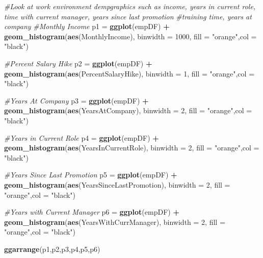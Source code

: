 \documentclass[]{article}
\newenvironment{Shaded}{\begin{snugshade}}{\end{snugshade}}
\newcommand{\KeywordTok}[1]{\textcolor[rgb]{0.13,0.29,0.53}{\textbf{#1}}}
\newcommand{\DataTypeTok}[1]{\textcolor[rgb]{0.13,0.29,0.53}{#1}}
\newcommand{\DecValTok}[1]{\textcolor[rgb]{0.00,0.00,0.81}{#1}}
\newcommand{\StringTok}[1]{\textcolor[rgb]{0.31,0.60,0.02}{#1}}
\newcommand{\CommentTok}[1]{\textcolor[rgb]{0.56,0.35,0.01}{\textit{#1}}}
\newcommand{\OperatorTok}[1]{\textcolor[rgb]{0.81,0.36,0.00}{\textbf{#1}}}
\newcommand{\NormalTok}[1]{#1}
\begin{document}
\begin{Shaded}
\begin{Highlighting}[]
\CommentTok{#Look at work environment dempgraphics such as income, years in current role,  time with current manager, years since last promotion}
\CommentTok{#training time, years at company}
\CommentTok{#Monthly Income}
\NormalTok{p1 =}\StringTok{ }\KeywordTok{ggplot}\NormalTok{(empDF) }\OperatorTok{+}\StringTok{ }\KeywordTok{geom_histogram}\NormalTok{(}\KeywordTok{aes}\NormalTok{(MonthlyIncome), }\DataTypeTok{binwidth =} \DecValTok{1000}\NormalTok{, }\DataTypeTok{fill =} \StringTok{"orange"}\NormalTok{,}\DataTypeTok{col =} \StringTok{"black"}\NormalTok{)}

\CommentTok{#Percent Salary Hike}
\NormalTok{p2 =}\StringTok{ }\KeywordTok{ggplot}\NormalTok{(empDF) }\OperatorTok{+}\StringTok{ }\KeywordTok{geom_histogram}\NormalTok{(}\KeywordTok{aes}\NormalTok{(PercentSalaryHike), }\DataTypeTok{binwidth =} \DecValTok{1}\NormalTok{, }\DataTypeTok{fill =} \StringTok{"orange"}\NormalTok{,}\DataTypeTok{col =} \StringTok{"black"}\NormalTok{)}

\CommentTok{#Years At Company}
\NormalTok{p3 =}\StringTok{ }\KeywordTok{ggplot}\NormalTok{(empDF) }\OperatorTok{+}\StringTok{ }\KeywordTok{geom_histogram}\NormalTok{(}\KeywordTok{aes}\NormalTok{(YearsAtCompany), }\DataTypeTok{binwidth =} \DecValTok{2}\NormalTok{, }\DataTypeTok{fill =} \StringTok{"orange"}\NormalTok{,}\DataTypeTok{col =} \StringTok{"black"}\NormalTok{)}

\CommentTok{#Years in Current Role}
\NormalTok{p4 =}\StringTok{ }\KeywordTok{ggplot}\NormalTok{(empDF) }\OperatorTok{+}\StringTok{ }\KeywordTok{geom_histogram}\NormalTok{(}\KeywordTok{aes}\NormalTok{(YearsInCurrentRole), }\DataTypeTok{binwidth =} \DecValTok{2}\NormalTok{, }\DataTypeTok{fill =} \StringTok{"orange"}\NormalTok{,}\DataTypeTok{col =} \StringTok{"black"}\NormalTok{)}

\CommentTok{#Years Since Last Promotion}
\NormalTok{p5 =}\StringTok{ }\KeywordTok{ggplot}\NormalTok{(empDF) }\OperatorTok{+}\StringTok{ }\KeywordTok{geom_histogram}\NormalTok{(}\KeywordTok{aes}\NormalTok{(YearsSinceLastPromotion), }\DataTypeTok{binwidth =} \DecValTok{2}\NormalTok{, }\DataTypeTok{fill =} \StringTok{"orange"}\NormalTok{,}\DataTypeTok{col =} \StringTok{"black"}\NormalTok{)}

\CommentTok{#Years with Current Manager}
\NormalTok{p6 =}\StringTok{ }\KeywordTok{ggplot}\NormalTok{(empDF) }\OperatorTok{+}\StringTok{ }\KeywordTok{geom_histogram}\NormalTok{(}\KeywordTok{aes}\NormalTok{(YearsWithCurrManager), }\DataTypeTok{binwidth =} \DecValTok{2}\NormalTok{, }\DataTypeTok{fill =} \StringTok{"orange"}\NormalTok{,}\DataTypeTok{col =} \StringTok{"black"}\NormalTok{)}

\KeywordTok{ggarrange}\NormalTok{(p1,p2,p3,p4,p5,p6)}
\end{Highlighting}
\end{Shaded}
\end{document}
